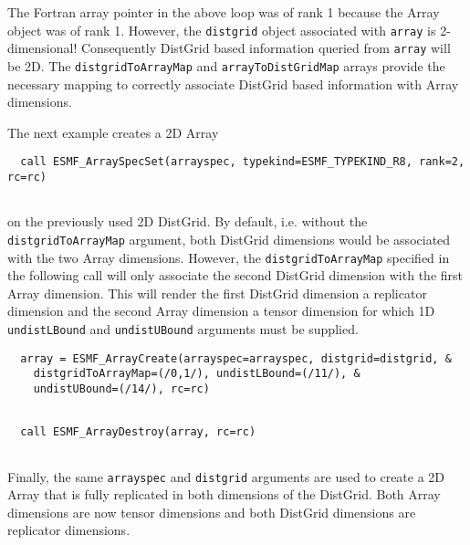 
   The Fortran array pointer in the above loop was of rank 1 because the
   Array object was of rank 1. However, the {\tt distgrid} object associated
   with {\tt array} is 2-dimensional! Consequently DistGrid based information
   queried from {\tt array} will be 2D. The {\tt distgridToArrayMap} and
   {\tt arrayToDistGridMap}
   arrays provide the necessary mapping to correctly associate DistGrid based 
   information with Array dimensions.
  
   The next example creates a 2D Array 

 \begin{verbatim}
  call ESMF_ArraySpecSet(arrayspec, typekind=ESMF_TYPEKIND_R8, rank=2, rc=rc)
 
\end{verbatim}
 

   on the previously used 2D DistGrid. By default, i.e. without the
   {\tt distgridToArrayMap}
   argument, both DistGrid dimensions would be associated with the two Array
   dimensions. However, the {\tt distgridToArrayMap} specified in the following
   call will only associate the second DistGrid dimension with the first Array 
   dimension. This will render the first DistGrid dimension a replicator
   dimension and the second Array dimension a tensor dimension for which 1D
   {\tt undistLBound} and {\tt undistUBound} arguments must be supplied. 

 \begin{verbatim}
  array = ESMF_ArrayCreate(arrayspec=arrayspec, distgrid=distgrid, &
    distgridToArrayMap=(/0,1/), undistLBound=(/11/), &
    undistUBound=(/14/), rc=rc)
 
\end{verbatim}
 

 \begin{verbatim}
  call ESMF_ArrayDestroy(array, rc=rc)
 
\end{verbatim}
 

   Finally, the same {\tt arrayspec} and {\tt distgrid} arguments are used to
   create a 2D Array that is fully replicated in both dimensions of the DistGrid.
   Both Array dimensions are now tensor dimensions and both DistGrid dimensions
   are replicator dimensions. 

